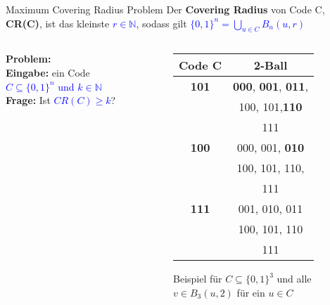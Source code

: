 \documentclass[10pt, aspectratio=169]{beamer}
\begin{document}
\begin{frame}{Maximum Covering Radius Problem}
Der \alert{\textbf{Covering Radius}} von Code C,  \textbf{CR(C)}, ist das kleinste \textcolor{blue}{$r\in \mathbb{N} $}, sodass gilt \textcolor{blue}{$\{0,1\}^n =  \bigcup_{u \in C} B_n(u,r)$}
\begin{columns}[T] %

    \begin{column}{0.35\textwidth}
        \vspace{2em}
        \textbf{\alert{Problem:}}\\
        \textbf{Eingabe:} ein Code  \textcolor{blue}{$C \subseteq \{0,1\}^n$ und $k \in \mathbb{N}$}\\
        \textbf{Frage:} Ist \textcolor{blue}{$CR(C)\geq k$}?
        
    \end{column}
    \begin{column}{0.4\textwidth}
     \begin{figure}
    \centering
        \begin{tabular}{|c||c|}
        \hline
            Code C & 2-Ball\\ 
        \hline
             \textbf{101} & \textbf{000}, \textbf{001}, \textbf{011}, \\ &100, 101,\textbf{110} \\ &111 \\ 

        \hline
             \textbf{100} &  000, 001, \textbf{010} \\ &100, 101, 110, \\ & 111 \\ 
        \hline
             \textbf{111} & 001, 010, 011 \\ &100, 101, 110\\ & 111 \\ 
            \hline
        \end{tabular}
    \caption{Beispiel für $C \subseteq \{0,1\}^3$ und alle $v \in B_3(u,2)$ für ein $u\in C$}
    \label{fig:enter-label}
\end{figure}
    \end{column}
\end{columns}

\end{frame}
\end{document}

